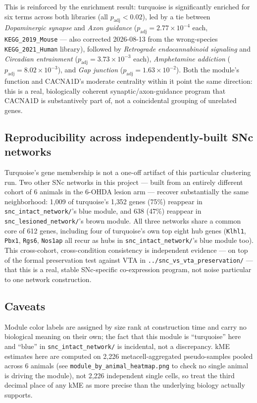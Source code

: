 \documentclass[11pt]{article}
\begin{document}
This is reinforced by the enrichment result: turquoise is significantly
enriched for six terms across both libraries (all $p_{\mathrm{adj}} < 0.02$),
led by a tie between \emph{Dopaminergic synapse} and \emph{Axon guidance}
($p_{\mathrm{adj}} = 2.77\times10^{-4}$ each, \texttt{KEGG\_2019\_Mouse} ---
also corrected 2026-08-13 from the wrong-species \texttt{KEGG\_2021\_Human}
library), followed by \emph{Retrograde endocannabinoid signaling} and
\emph{Circadian entrainment} ($p_{\mathrm{adj}}=3.73\times10^{-3}$ each),
\emph{Amphetamine addiction} ($p_{\mathrm{adj}}=8.02\times10^{-3}$), and
\emph{Gap junction} ($p_{\mathrm{adj}}=1.63\times10^{-2}$). Both the module's
function and CACNA1D's moderate centrality within it point the same
direction: this is a real, biologically coherent synaptic/axon-guidance
program that CACNA1D is substantively part of, not a coincidental grouping
of unrelated genes.

\subsection*{Reproducibility across independently-built SNc networks}

Turquoise's gene membership is not a one-off artifact of this particular
clustering run. Two other SNc networks in this project --- built from an
entirely different cohort of 6 animals in the 6-OHDA lesion arm --- recover
substantially the same neighborhood: 1{,}009 of turquoise's 1{,}352 genes
(75\%) reappear in \texttt{snc\_intact\_network/}'s blue module, and 638
(47\%) reappear in \texttt{snc\_lesioned\_network/}'s brown module. All
three networks share a common core of 612 genes, including four of
turquoise's own top eight hub genes (\texttt{Klhl1}, \texttt{Pbx1},
\texttt{Rgs6}, \texttt{Nos1ap} all recur as hubs in
\texttt{snc\_intact\_network/}'s blue module too). This cross-cohort,
cross-condition consistency is independent evidence --- on top of the
formal preservation test against VTA in
\texttt{../snc\_vs\_vta\_preservation/} --- that this is a real, stable
SNc-specific co-expression program, not noise particular to one network
construction.

\subsection*{Caveats}

Module color labels are assigned by size rank at construction time and
carry no biological meaning on their own; the fact that this module is
``turquoise'' here and ``blue'' in \texttt{snc\_intact\_network/} is
incidental, not a discrepancy. kME estimates here are computed on 2{,}226
metacell-aggregated pseudo-samples pooled across 6 animals (see
\texttt{module\_by\_animal\_heatmap.png} to check no single animal is
driving the module), not 2{,}226 independent single cells, so treat the
third decimal place of any kME as more precise than the underlying biology
actually supports.
\end{document}
